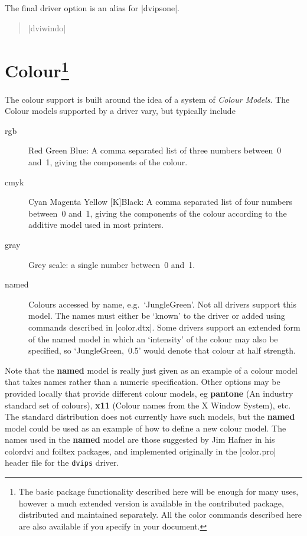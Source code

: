The final driver option is an alias for |dvipsone|.
\begin{quote}\raggedright
  |dviwindo|
\end{quote}


\section[Colour]{Colour\footnote{%
The basic  package functionality described here
will be enough for many uses, however a much extended version
is available in the contributed  package, distributed
and maintained separately. All the color commands described here are
also available if you specify  in your document.}%
}
The colour support is built around the idea of a system of
\emph{Colour Models}. The Colour models supported by a driver vary,
but typically include
\begin{description}
\item[rgb] Red Green Blue: A comma separated list of three numbers
  between~0 and~1, giving the components of the colour.
\item[cmyk] Cyan Magenta Yellow [K]Black:  A comma separated list of
  four numbers between~0 and~1, giving the components of the colour
  according to the additive model used in most printers.
\item[gray] Grey scale: a single number between~0 and~1.
\item[named] Colours accessed by name, e.g.\ `JungleGreen'. Not all
  drivers support this model. The names must either be `known' to the
  driver or added using commands described in |color.dtx|. Some drivers
  support an extended form of the named model in which an `intensity' of
  the colour may also be specified, so `\mbox{JungleGreen, 0.5}' would
  denote that colour at half strength.
\end{description}
Note that the \textbf{named} model is really just given as an example
of a colour model that takes names rather than a numeric specification.
Other options may be provided locally that provide different colour
models, eg \textbf{pantone} (An industry standard set of colours),
\textbf{x11} (Colour names from the X Window System), etc. The
standard distribution does not currently have such models, but the
\textbf{named} model could be used as an example of how to define a new
colour model. The names used in the \textbf{named} model are those
suggested by Jim Hafner in his \textsf{colordvi} and \textsf{foiltex}
packages, and implemented originally in the |color.pro| header file for
the \texttt{dvips} driver.

